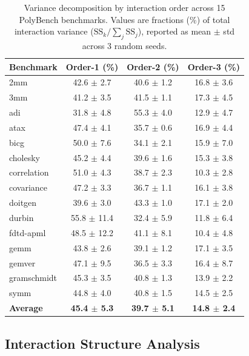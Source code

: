 \documentclass[preprint]{article}
\begin{document}
\begin{table}[t]
\caption{Variance decomposition by interaction order across 15 PolyBench benchmarks. Values are fractions (\%) of total interaction variance ($\text{SS}_k / \sum_j \text{SS}_j$), reported as mean $\pm$ std across 3 random seeds.}
\label{tab:variance}
\centering
\small
\begin{tabular}{lccc}
\toprule
Benchmark & Order-1 (\%) & Order-2 (\%) & Order-3 (\%) \\
\midrule
2mm         & 42.6 $\pm$ 2.7 & 40.6 $\pm$ 1.2 & 16.8 $\pm$ 3.6 \\
3mm         & 41.2 $\pm$ 3.5 & 41.5 $\pm$ 1.1 & 17.3 $\pm$ 4.5 \\
adi         & 31.8 $\pm$ 4.8 & 55.3 $\pm$ 4.0 & 12.9 $\pm$ 4.7 \\
atax        & 47.4 $\pm$ 4.1 & 35.7 $\pm$ 0.6 & 16.9 $\pm$ 4.4 \\
bicg        & 50.0 $\pm$ 7.6 & 34.1 $\pm$ 2.1 & 15.9 $\pm$ 7.0 \\
cholesky    & 45.2 $\pm$ 4.4 & 39.6 $\pm$ 1.6 & 15.3 $\pm$ 3.8 \\
correlation & 51.0 $\pm$ 4.3 & 38.7 $\pm$ 2.3 & 10.3 $\pm$ 2.8 \\
covariance  & 47.2 $\pm$ 3.3 & 36.7 $\pm$ 1.1 & 16.1 $\pm$ 3.8 \\
doitgen     & 39.6 $\pm$ 3.0 & 43.3 $\pm$ 1.0 & 17.1 $\pm$ 2.0 \\
durbin      & 55.8 $\pm$ 11.4 & 32.4 $\pm$ 5.9 & 11.8 $\pm$ 6.4 \\
fdtd-apml   & 48.5 $\pm$ 12.2 & 41.1 $\pm$ 8.1 & 10.4 $\pm$ 4.8 \\
gemm        & 43.8 $\pm$ 2.6 & 39.1 $\pm$ 1.2 & 17.1 $\pm$ 3.5 \\
gemver      & 47.1 $\pm$ 9.5 & 36.5 $\pm$ 3.3 & 16.4 $\pm$ 8.7 \\
gramschmidt & 45.3 $\pm$ 3.5 & 40.8 $\pm$ 1.3 & 13.9 $\pm$ 2.2 \\
symm        & 44.8 $\pm$ 4.0 & 40.8 $\pm$ 1.5 & 14.5 $\pm$ 2.5 \\
\midrule
\textbf{Average} & \textbf{45.4 $\pm$ 5.3} & \textbf{39.7 $\pm$ 5.1} & \textbf{14.8 $\pm$ 2.4} \\
\bottomrule
\end{tabular}
\end{table}

\subsection{Interaction Structure Analysis}
\end{document}
